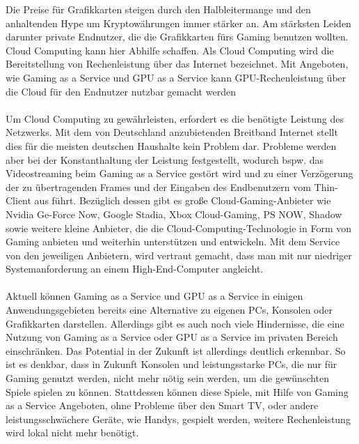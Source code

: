 \documentclass[12pt,toc=bib,toc=listof]{scrreprt}
\title{\topic}
\author{\studentnameA { ({\studentidA)}}, \\ \studentnameB { ({\studentidB)}}, \\ \studentnameC { ({\studentidC)}} }
\date {\semester}
\begin{document}
\sffamily
\maketitle

\label{sec:management_summary}
Die Preise für Grafikkarten steigen durch den Halbleitermange und den anhaltenden Hype um 
Kryptowährungen immer stärker an. Am stärksten Leiden darunter private Endnutzer, die die 
Grafikkarten fürs Gaming benutzen wollten. Cloud Computing kann hier Abhilfe schaffen. Als Cloud 
Computing wird die Bereitstellung von Rechenleistung über das Internet bezeichnet. Mit Angeboten, 
wie Gaming as a Service und GPU as a Service kann GPU-Rechenleistung über die Cloud für den Endnutzer 
nutzbar gemacht werden\\
\\Um Cloud Computing zu gewährleisten, erfordert es die benötigte Leistung des Netzwerks. 
Mit dem von Deutschland anzubietenden Breitband Internet stellt dies für die meisten deutschen Haushalte kein Problem dar. 
Probleme werden aber bei der Konstanthaltung der Leistung festgestellt, wodurch bspw. das Videostreaming beim Gaming as a Service gestört 
wird und zu einer Verzögerung der zu übertragenden Frames und der Eingaben des Endbenutzern vom Thin-Client aus führt. Bezüglich dessen gibt es 
große Cloud-Gaming-Anbieter wie Nvidia Ge-Force Now, Google Stadia, Xbox Cloud-Gaming, PS NOW, Shadow sowie weitere kleine Anbieter, die die 
Cloud-Computing-Technologie in Form von Gaming anbieten und weiterhin unterstützen und entwickeln. Mit dem Service von den jeweiligen Anbietern, 
wird vertraut gemacht, dass man mit nur niedriger Systemanforderung an einem High-End-Computer angleicht.\\
\\Aktuell können Gaming as a Service und GPU as a Service in einigen Anwendungsgebieten bereits eine Alternative zu eigenen PCs, Konsolen oder 
Grafikkarten darstellen. Allerdings gibt es auch noch viele Hindernisse, die eine Nutzung von Gaming as a Service oder GPU as a Service  im privaten 
Bereich einschränken. Das Potential in der Zukunft ist allerdings deutlich erkennbar. So ist es denkbar, dass in Zukunft Konsolen und leistungsstarke 
PCs, die nur für Gaming genutzt werden, nicht mehr nötig sein werden, um die gewünschten Spiele spielen zu können. Stattdessen können diese Spiele, mit 
Hilfe von Gaming as a Service Angeboten, ohne Probleme über den Smart TV, oder andere leistungsschwächere Geräte, wie Handys, gespielt werden, weitere 
Rechenleistung wird lokal nicht mehr benötigt.\\
\end{document}
